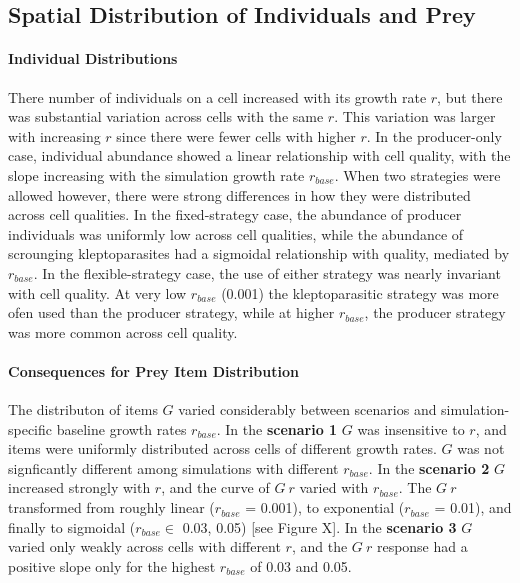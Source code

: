 \documentclass[11pt]{article}
\begin{document}
\subsection*{Spatial Distribution of Individuals and Prey}

\paragraph{Individual Distributions}

There number of individuals on a cell increased with its growth rate $r$, but there was substantial variation across cells with the same $r$. 
This variation was larger with increasing $r$ since there were fewer cells with higher $r$.
In the producer-only case, individual abundance showed a linear relationship with cell quality, with the slope increasing with the simulation growth rate $r_{base}$.
When two strategies were allowed however, there were strong differences in how they were distributed across cell qualities.
In the fixed-strategy case, the abundance of producer individuals was uniformly low across cell qualities, while the abundance of scrounging kleptoparasites had a sigmoidal relationship with quality, mediated by $r_{base}$.
In the flexible-strategy case, the use of either strategy was nearly invariant with cell quality.
At very low $r_{base}$ (0.001) the kleptoparasitic strategy was more ofen used than the producer strategy, while at higher $r_{base}$, the producer strategy was more common across cell quality.

\paragraph{Consequences for Prey Item Distribution}

The distributon of items $G$ varied considerably between scenarios and simulation-specific baseline growth rates $r_{base}$.
In the \textbf{scenario 1} $G$ was insensitive to $r$, and items were uniformly distributed across cells of different growth rates.
$G$ was not signficantly different among simulations with different $r_{base}$.
In the \textbf{scenario 2} $G$ increased strongly with $r$, and the curve of $G ~ r$ varied with $r_{base}$.
The $G ~ r$ transformed from roughly linear ($r_{base}$ = 0.001), to exponential ($r_{base}$ = 0.01), and finally to sigmoidal ($r_{base} \in$ 0.03, 0.05) [see Figure X].
In the \textbf{scenario 3} $G$ varied only weakly across cells with different $r$, and the $G ~ r$ response had a positive slope only for the highest $r_{base}$ of 0.03 and 0.05.
\end{document}
